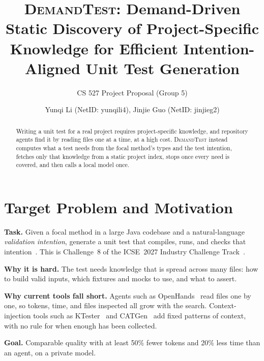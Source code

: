 \documentclass[sigconf,nonacm]{acmart}
\newcommand{\tool}{\textsc{DemandTest}\xspace}
\begin{document}
\title{\tool: Demand-Driven Static Discovery of Project-Specific Knowledge for Efficient Intention-Aligned Unit Test Generation}
\subtitle{CS 527 Project Proposal (Group 5)}

\author{Yunqi Li (NetID: yunqili4), Jinjie Guo (NetID: jinjieg2)}

\begin{abstract}
Writing a unit test for a real project requires project-specific knowledge, and repository agents find it by reading files one at a time, at a high cost. \tool instead computes what a test needs from the focal method's types and the test intention, fetches only that knowledge from a static project index, stops once every need is covered, and then calls a local model once.
\end{abstract}


\maketitle

\section{Target Problem and Motivation}
\textbf{Task.} Given a focal method in a large Java codebase and a natural-language \emph{validation intention}, generate a unit test that compiles, runs, and checks that intention~\cite{qi2025intentiontest}. This is Challenge~8 of the ICSE~2027 Industry Challenge Track~\cite{icse27challenge8}.

\textbf{Why it is hard.} The test needs knowledge that is spread across many files: how to build valid inputs, which fixtures and mocks to use, and what to assert.

\textbf{Why current tools fall short.} Agents such as OpenHands~\cite{wang2025openhands} read files one by one, so tokens, time, and files inspected all grow with the search. Context-injection tools such as KTester~\cite{li2026ktester} and CATGen~\cite{chen2026catgen} add fixed patterns of context, with no rule for when enough has been collected.

\textbf{Goal.} Comparable quality with at least 50\% fewer tokens and 20\% less time than an agent, on a private model.
\end{document}
